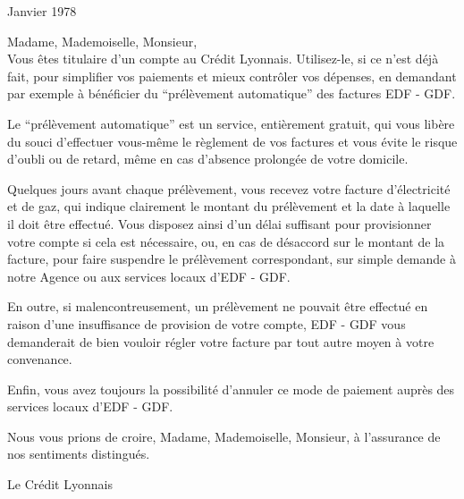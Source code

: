 \begin{flushright}Janvier 1978\\\end{flushright}

\noindent Madame, Mademoiselle, Monsieur,\\

Vous êtes titulaire d'un compte au Crédit Lyonnais. Utilisez-le, si ce n'est déjà fait, pour simplifier vos paiements et mieux contrôler vos dépenses, en demandant par exemple à bénéficier du ``prélèvement automatique'' des factures EDF - GDF.

Le ``prélèvement automatique'' est un service, entièrement gratuit, qui vous libère du souci d'effectuer vous-même le règlement de vos factures et vous évite le risque d'oubli ou de retard, même en cas d'absence prolongée de votre domicile.

Quelques jours avant chaque prélèvement, vous recevez votre facture d'électricité et de gaz, qui indique clairement le montant du prélèvement et la date à laquelle il doit être effectué. Vous disposez ainsi d'un délai suffisant pour provisionner votre compte si cela est nécessaire, ou, en cas de désaccord sur le montant de la facture, pour faire suspendre le prélèvement correspondant, sur simple demande à notre Agence ou aux services locaux d'EDF - GDF.

En outre, si malencontreusement, un prélèvement ne pouvait être effectué en raison d'une insuffisance de provision de votre compte, EDF - GDF vous demanderait de bien vouloir régler votre facture par tout autre moyen à votre convenance.

Enfin, vous avez toujours la possibilité d'annuler ce mode de paiement auprès des services locaux d'EDF - GDF.

Nous vous prions de croire, Madame, Mademoiselle, Monsieur, à l'assurance de nos sentiments distingués.\\

\begin{flushright}Le Crédit Lyonnais\\\end{flushright}

